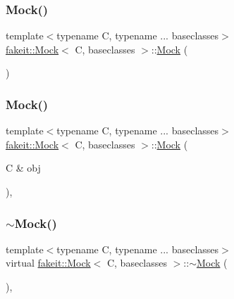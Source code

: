\subsubsection{\texorpdfstring{Mock()}{Mock()}\hspace{0.1cm}{\footnotesize\ttfamily [9/18]}}
{\footnotesize\ttfamily template$<$typename C, typename ... baseclasses$>$ \\
\mbox{\hyperlink{classfakeit_1_1Mock}{fakeit\+::\+Mock}}$<$ C, baseclasses $>$\+::\mbox{\hyperlink{classfakeit_1_1Mock}{Mock}} (\begin{DoxyParamCaption}{ }\end{DoxyParamCaption})\hspace{0.3cm}{\ttfamily [inline]}}

\mbox{\label{classfakeit_1_1Mock_aa474a0d6c7447608253a0fc306eb6ef5}} 
\subsubsection{\texorpdfstring{Mock()}{Mock()}\hspace{0.1cm}{\footnotesize\ttfamily [10/18]}}
{\footnotesize\ttfamily template$<$typename C, typename ... baseclasses$>$ \\
\mbox{\hyperlink{classfakeit_1_1Mock}{fakeit\+::\+Mock}}$<$ C, baseclasses $>$\+::\mbox{\hyperlink{classfakeit_1_1Mock}{Mock}} (\begin{DoxyParamCaption}\item[{C \&}]{obj }\end{DoxyParamCaption})\hspace{0.3cm}{\ttfamily [inline]}, {\ttfamily [explicit]}}

\mbox{\label{classfakeit_1_1Mock_af5ecff29779ab75289c260d0a56705ab}} 
\subsubsection{\texorpdfstring{$\sim$Mock()}{~Mock()}\hspace{0.1cm}{\footnotesize\ttfamily [6/9]}}
{\footnotesize\ttfamily template$<$typename C, typename ... baseclasses$>$ \\
virtual \mbox{\hyperlink{classfakeit_1_1Mock}{fakeit\+::\+Mock}}$<$ C, baseclasses $>$\+::$\sim$\mbox{\hyperlink{classfakeit_1_1Mock}{Mock}} (\begin{DoxyParamCaption}{ }\end{DoxyParamCaption})\hspace{0.3cm}{\ttfamily [virtual]}, {\ttfamily [default]}}


